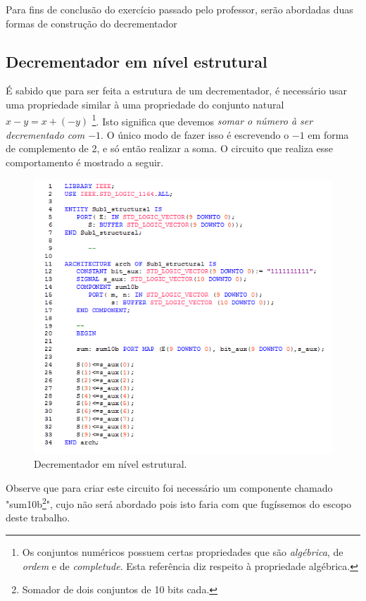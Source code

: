 \documentclass[12pt,a4paper]{article}
\begin{document}
\par Para fins de conclusão do exercício passado pelo professor, serão abordadas duas formas de construção do decrementador
\newpage
\subsection{Decrementador em nível estrutural}

É sabido que para ser feita a estrutura de um decrementador, é necessário usar uma propriedade similar à uma propriedade do conjunto natural $ x-y = x+(-y)$ \footnote{Os conjuntos numéricos possuem certas propriedades que são \emph{algébrica}, de \emph{ordem} e de \emph{completude}. Esta referência diz respeito à propriedade algébrica.}. Isto significa que devemos \emph{somar o número à ser decrementado com $-1$}. O único modo de fazer isso é escrevendo o $-1$ em forma de complemento de 2, e só então realizar a soma. O circuito que realiza esse comportamento é mostrado a seguir.
\begin{figure}[h]
\includegraphics{fig2.png}
\caption{Decrementador em nível estrutural.}
\label{fg:decrementador_estrutural}
\end{figure}

Observe que para criar este circuito foi necessário um componente chamado "sum10b\footnote{Somador de dois conjuntos de 10 bits cada.}", cujo não será abordado pois isto faria com que fugíssemos do escopo deste trabalho.
\end{document}
